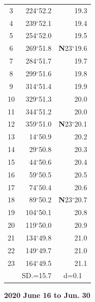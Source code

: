 \documentclass[10pt, a4paper]{report}
\begin{document}
\begin{scriptsize}
\begin{tabular*}{0.2\textwidth}[t]{@{\extracolsep{\fill}}|c|rr|}
3 & 224$^\circ$52.2 & \raisebox{0.24ex}{\boldmath$\cdot$~\boldmath$\cdot$~~}19.3\\
4 & 239$^\circ$52.1 & 19.4\\
5 & 254$^\circ$52.0 & 19.5\\[2Pt]
6 & 269$^\circ$51.8 & \textbf{N}23$^\circ$19.6\\
7 & 284$^\circ$51.7 & 19.7\\
8 & 299$^\circ$51.6 & 19.8\\
9 & 314$^\circ$51.4 & \raisebox{0.24ex}{\boldmath$\cdot$~\boldmath$\cdot$~~}19.9\\
10 & 329$^\circ$51.3 & 20.0\\
11 & 344$^\circ$51.2 & 20.0\\[2Pt]
12 & 359$^\circ$51.0 & \textbf{N}23$^\circ$20.1\\
13 & 14$^\circ$50.9 & 20.2\\
14 & 29$^\circ$50.8 & 20.3\\
15 & 44$^\circ$50.6 & \raisebox{0.24ex}{\boldmath$\cdot$~\boldmath$\cdot$~~}20.4\\
16 & 59$^\circ$50.5 & 20.5\\
17 & 74$^\circ$50.4 & 20.6\\[2Pt]
18 & 89$^\circ$50.2 & \textbf{N}23$^\circ$20.7\\
19 & 104$^\circ$50.1 & 20.8\\
20 & 119$^\circ$50.0 & 20.9\\
21 & 134$^\circ$49.8 & \raisebox{0.24ex}{\boldmath$\cdot$~\boldmath$\cdot$~~}21.0\\
22 & 149$^\circ$49.7 & 21.0\\
23 & 164$^\circ$49.5 & 21.1\\
\hline
\rule{0pt}{2.4ex} & \multicolumn{1}{c}{SD.=15.7} & \multicolumn{1}{c|}{d=0.1}\\
\hline
\end{tabular*}

\end{scriptsize}
\newpage
\sffamily
\noindent
\begin{flushright}
\textbf{2020 June 16 to Jun. 30}\par
\end{flushright}
\end{document}
